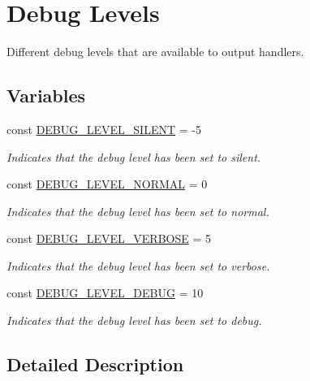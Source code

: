 \hypertarget{group__debug__levels}{\section{Debug Levels}
\label{group__debug__levels}
}


Different debug levels that are available to output handlers.  


\subsection*{Variables}
\begin{DoxyCompactItemize}
\item 
const \hyperlink{group__debug__levels_gad716f4611d7ac151f96d2ff10f681786}{D\-E\-B\-U\-G\-\_\-\-L\-E\-V\-E\-L\-\_\-\-S\-I\-L\-E\-N\-T} = -\/5
\begin{DoxyCompactList}\small\item\em Indicates that the debug level has been set to silent. \end{DoxyCompactList}\item 
const \hyperlink{group__debug__levels_ga412f8ed486afa7fea7c81b35d0db39ba}{D\-E\-B\-U\-G\-\_\-\-L\-E\-V\-E\-L\-\_\-\-N\-O\-R\-M\-A\-L} = 0
\begin{DoxyCompactList}\small\item\em Indicates that the debug level has been set to normal. \end{DoxyCompactList}\item 
const \hyperlink{group__debug__levels_ga3f6f7f3818bca5ef6263d121cecb584e}{D\-E\-B\-U\-G\-\_\-\-L\-E\-V\-E\-L\-\_\-\-V\-E\-R\-B\-O\-S\-E} = 5
\begin{DoxyCompactList}\small\item\em Indicates that the debug level has been set to verbose. \end{DoxyCompactList}\item 
const \hyperlink{group__debug__levels_ga081b2a8b4f0b1d1216fd2f143c8bc1a6}{D\-E\-B\-U\-G\-\_\-\-L\-E\-V\-E\-L\-\_\-\-D\-E\-B\-U\-G} = 10
\begin{DoxyCompactList}\small\item\em Indicates that the debug level has been set to debug. \end{DoxyCompactList}\end{DoxyCompactItemize}


\subsection{Detailed Description}



